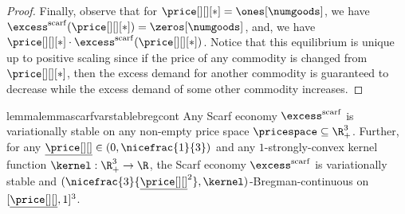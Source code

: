 \begin{proof}
    Finally, observe that for $\price[][][*] = \ones[\numgoods]$, we have $\excess^{\mathrm{scarf}}(\price[][][*]) = \zeros[\numgoods]$, and, we have $\price[][][*] \cdot \excess^{\mathrm{scarf}}(\price[][][*])$. Notice that this equilibrium is unique up to positive scaling since if the price of any commodity is changed from $\price[][][*]$, then the excess demand for another commodity is guaranteed to decrease while the excess demand of some other commodity increases. 
\end{proof}



\begin{restatable}{lemma}{lemmascarfvarstablebregcont}\label{lemma:scarf_var_stable_breg_cont}
        Any Scarf economy $\excess^{\mathrm{scarf}}$ is variationally stable on any non-empty price space $\pricespace \subseteq \R^3_+$. Further, for any $\underline{\price[ ][]} \in (0, \nicefrac{1}{3})$ and any $1$-strongly-convex kernel function $\kernel: \R^3_+ \to \R$, the Scarf economy $\excess^{\mathrm{scarf}}$ is variationally stable and $(\nicefrac{3}{\underline{\price[ ][]}^2}, \kernel)$-Bregman-continuous on $[\underline{\price[ ][]}, 1]^3$.
\end{restatable}
